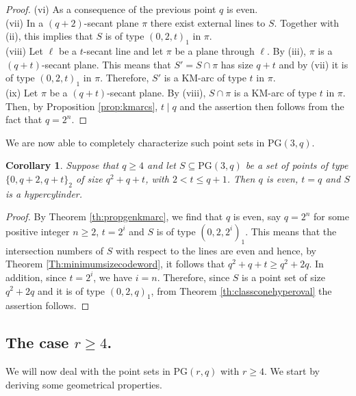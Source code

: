 \documentclass[11pt]{amsart}
\newtheorem{corollary}[theorem]{Corollary}
\newcommand{\PG}{\mathrm{PG}}
\newcommand{\set}[1]{ \left \{ #1 \right \} }
\newcommand{\sam}[1]{\textcolor{purple}{#1}}
\begin{document}
\begin{proof}
(vi) As a consequence of the previous point $q$ is even.\\
(vii) In a $(q+2)$-secant plane $\pi$ there exist external lines to $S$. Together with (ii), this implies that $S$ is of type $(0,2,t)_1$ in $\pi$. \\
(viii) Let $\ell$ be a $t$-secant line and let $\pi$ be a plane through $\ell$. By (iii), $\pi$ is a $(q+t)$-secant plane.
This means that $S'=S\cap \pi$ has size $q+t$ and by (vii) it is of type $(0,2,t)_1$ in $\pi$. Therefore, $S'$ is a KM-arc of type $t$ in $\pi$. \\
(ix) Let $\pi$ be a $(q+t)$-secant plane. By (viii), $S\cap \pi$ is a KM-arc of type $t$ in $\pi$. Then, by Proposition \ref{prop:kmarcs}, $t \mid q$ and the assertion then follows from the fact that $q=2^n$.
\end{proof}


We are now able to completely characterize such point sets in $\PG(3,q)$.

\begin{corollary}\label{cor:charr=3}
Suppose that $q \geq 4$ and let $S \subseteq \PG(3,q)$ be a set of points of type $\{0,q+2,q+t\}_2$ of size $q^2+q+t$, with $2<t \leq q+1$. Then $q$ is even, $t=q$ and $S$ is a hypercylinder.
\end{corollary}
\begin{proof}
By Theorem \ref{th:propgenkmarc}, we find that $q$ is even, say $q=2^n$ for some positive integer $n \geq 2$, $t=2^i$ and $S$ is of type $(0,2,2^i)_1$. This means that the intersection numbers of $S$ with respect to the lines are even and hence, by Theorem \ref{Th:minimumsizecodeword}, it follows that $q^2+q+t\geq q^2+2q$. In addition, since $t=2^i$, we have $i=n$.
Therefore, since $S$ is a point set of size $q^2+2q$ and it is of type $(0,2,q)_1$, from Theorem \ref{th:classconehyperoval} the assertion follows.
\end{proof}

\subsection{\texorpdfstring{The case $r\geq 4$.}{The case r>=4.}}
We will now deal with the point sets in $\PG(r,q)$ with $r \geq 4$. We start by deriving some geometrical properties. 
\end{document}
